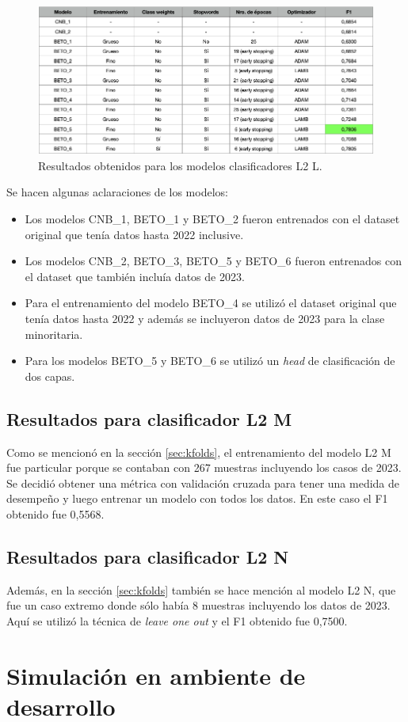 \begin{figure}[htbp]
	\centering
	\includegraphics[width=1\textwidth]{./Figures/cap4-resultados-l2l.png}
	\caption{Resultados obtenidos para los modelos clasificadores L2 L.}
	\label{fig:res-l2l}
\end{figure}

Se hacen algunas aclaraciones de los modelos:
\begin{itemize}
	\item Los modelos CNB\_1, BETO\_1 y BETO\_2 fueron entrenados con el dataset original que tenía datos hasta 2022 inclusive.
	\item Los modelos CNB\_2, BETO\_3, BETO\_5 y BETO\_6 fueron entrenados con el dataset que también incluía datos de 2023.
	\item Para el entrenamiento del modelo BETO\_4 se utilizó el dataset original que tenía datos hasta 2022 y además se incluyeron datos de 2023 para la clase minoritaria.
	\item Para los modelos BETO\_5 y BETO\_6 se utilizó un \textit{head} de clasificación de dos capas.
\end{itemize}

\subsection{Resultados para clasificador L2 M}

Como se mencionó en la sección \ref{sec:kfolds}, el entrenamiento del modelo L2 M fue particular porque se contaban con 267 muestras incluyendo los casos de 2023. Se decidió obtener una métrica con validación cruzada para tener una medida de desempeño y luego entrenar un modelo con todos los datos. En este caso el F1 obtenido fue 0,5568.

\subsection{Resultados para clasificador L2 N}

Además, en la sección \ref{sec:kfolds} también se hace mención al modelo L2 N, que fue un caso extremo donde sólo había 8 muestras incluyendo los datos de 2023. Aquí se utilizó la técnica de \textit{leave one out} y el F1 obtenido fue 0,7500.

\section{Simulación en ambiente de desarrollo}


